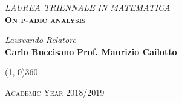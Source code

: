 \begin{titlepage}
\begin{center}
		\vspace{1cm}
		\emph{\Large{LAUREA TRIENNALE IN MATEMATICA}} \\
		\vspace{1.5cm}
		\scshape{\Large{\bfseries{On p-adic analysis}}} \\
	\end{center}
	
	\vfill
	\begin{normalsize}
		\begin{flushleft}
			  \hspace{45pt} \textit{Laureando} \hspace{160pt} \textit{Relatore}\\
			  \vspace{5pt}
			  \hspace{30pt} \large{\textbf{Carlo Buccisano}} \hspace{70pt} \large{\textbf{Prof. Maurizio Cailotto}}\\
			  \vspace{10pt}
		\end{flushleft}
	\end{normalsize}
	
	\vfill
	\begin{center}
		\hspace{-0.2cm}
		\line(1, 0){360}
		
		\textsc{Academic Year 2018/2019}
	\end{center}
\end{titlepage}